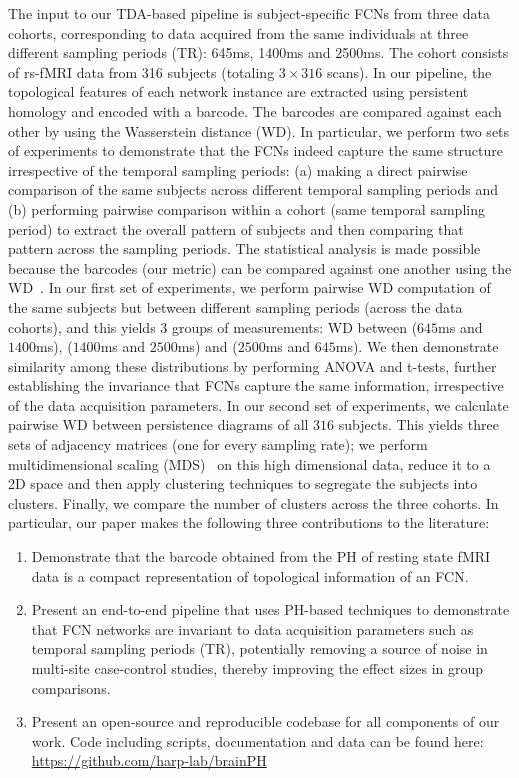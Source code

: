 The input to our TDA-based pipeline is subject-specific FCNs from three data cohorts, corresponding to data acquired from the same individuals at three different sampling periods (TR):  645ms, 1400ms and 2500ms. The cohort consists of rs-fMRI data from 316 subjects (totaling $3 \times 316$ scans). In our pipeline, %
the topological features of each network instance are extracted using persistent homology and encoded with a barcode. The barcodes are compared against each other by using the Wasserstein distance (WD). In particular, we perform two sets of experiments to demonstrate that the FCNs indeed capture the same structure irrespective of the temporal sampling periods: (a) making a direct pairwise comparison of the same subjects across different temporal sampling periods and (b) performing pairwise comparison within a cohort (same temporal sampling period) to extract the overall pattern of subjects and then comparing that pattern across the sampling periods. The statistical analysis is made possible because the barcodes (our metric) can be compared against one another using the WD~\cite{vallender1974calculation, edelsbrunner2013persistent}. 
In our first set of experiments, we perform pairwise WD computation of the same subjects but between different sampling periods (across the data cohorts), and this yields $3$ groups of measurements: WD between ($645$ms and $1400$ms), ($1400$ms and $2500$ms) and ($2500$ms and $645$ms). We then demonstrate similarity among these distributions by performing ANOVA and t-tests, further establishing the invariance that FCNs capture the same information, irrespective of the data acquisition parameters.
In our second set of experiments, we calculate pairwise WD between persistence diagrams of all $316$ subjects. This yields three sets of adjacency matrices (one for every sampling rate); we perform multidimensional scaling (MDS)~\cite{carroll1998multidimensional, cox2008multidimensional} on this high dimensional data, reduce it to a 2D space and then apply clustering techniques to segregate the subjects into clusters. Finally, we compare the number of clusters across the three cohorts. In particular, our paper makes the following three contributions to the literature:
\begin{enumerate}
\item Demonstrate that the barcode obtained from the PH of resting state fMRI data is a compact representation of topological information of an FCN.
\item Present an end-to-end pipeline that uses PH-based techniques to demonstrate that FCN networks are invariant to data acquisition parameters such as temporal sampling periods (TR), potentially removing a source of noise in multi-site case-control studies, thereby improving the effect sizes in group comparisons. 
\item Present an open-source and reproducible codebase for all components of our work. Code including scripts, documentation and data can be found here: \url{https://github.com/harp-lab/brainPH}
\end{enumerate}

